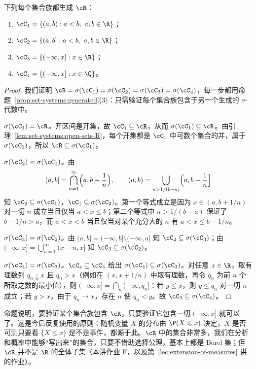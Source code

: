 \begin{proposition}\label{prop:set-systems:borel-generators}
下列每个集合族都生成 $\cR$：
\begin{enumerate}
\item $\cC_1=\{(a,b): a<b,\ a,b\in\R\}$；
\item $\cC_2=\{(a,b]: a<b,\ a,b\in\R\}$；
\item $\cC_3=\{(-\infty,x]: x\in\R\}$；
\item $\cC_4=\{(-\infty,x]: x\in\Q\}$。
\end{enumerate}
\end{proposition}
\begin{proof}
我们证明 $\cR=\sigma(\cC_1)=\sigma(\cC_2)=\sigma(\cC_3)=\sigma(\cC_4)$，每一步都用命题~\ref{prop:set-systems:generated}(3)：只需验证每个集合族包含于另一个生成的 $\sigma$-代数中。

\emph{$\sigma(\cC_1)=\cR$。}开区间是开集，故 $\cC_1\subseteq\cR$，从而 $\sigma(\cC_1)\subseteq\cR$。由引理~\ref{lem:set-systems:open-sets-R}，每个开集都是 $\cC_1$ 中可数个集合的并，属于 $\sigma(\cC_1)$，所以 $\cR\subseteq\sigma(\cC_1)$。

\emph{$\sigma(\cC_2)=\sigma(\cC_1)$。}由
\[
(a,b]=\bigcap_{n=1}^\infty\Bigl(a,b+\frac1n\Bigr),\qquad (a,b)=\bigcup_{n>1/(b-a)}\Bigl(a,b-\frac1n\Bigr]
\]
知 $\cC_2\subseteq\sigma(\cC_1)$，$\cC_1\subseteq\sigma(\cC_2)$。第一个等式成立是因为 $x\in(a,b+1/n)$ 对一切 $n$ 成立当且仅当 $a<x\leqslant b$；第二个等式中 $n>1/(b-a)$ 保证了 $b-1/n>a$，而 $a<x<b$ 当且仅当对某个充分大的 $n$ 有 $a<x\leqslant b-1/n$。

\emph{$\sigma(\cC_3)=\sigma(\cC_2)$。}由 $(a,b]=(-\infty,b]\setminus(-\infty,a]$ 知 $\cC_2\subseteq\sigma(\cC_3)$；由 $(-\infty,x]=\bigcup_{n=1}^\infty(x-n,x]$ 知 $\cC_3\subseteq\sigma(\cC_2)$。

\emph{$\sigma(\cC_4)=\sigma(\cC_3)$。}$\cC_4\subseteq\cC_3$ 给出 $\sigma(\cC_4)\subseteq\sigma(\cC_3)$。对任意 $x\in\R$，取有理数列 $q_n\downarrow x$ 且 $q_n>x$（例如在 $(x,x+1/n)$ 中取有理数，再令 $q_n$ 为前 $n$ 个所取之数的最小值），则 $(-\infty,x]=\bigcap_n(-\infty,q_n]$：若 $y\leqslant x$，则 $y\leqslant q_n$ 对一切 $n$ 成立；若 $y>x$，由于 $q_n\to x$，存在 $n$ 使 $q_n<y$。故 $\cC_3\subseteq\sigma(\cC_4)$。
\end{proof}

\begin{remark}
命题说明，要验证某个集合族包含 $\cR$，只要验证它包含一切 $(-\infty,x]$ 就可以了。这是今后反复使用的原则：随机变量 $X$ 的分布由 $\P(X\leqslant x)$ 决定，$X$ 是否可测只要看 $\{X\leqslant x\}$ 是不是事件，都源于此。$\cR$ 中的集合非常多，我们在分析和概率中能够“写出来”的集合，只要不借助选择公理，基本上都是 Borel 集；但 $\cR$ 并不是 $\R$ 的全体子集（本讲作业 F，以及第~\ref{lec:extension-of-measures} 讲的作业）。
\end{remark}

